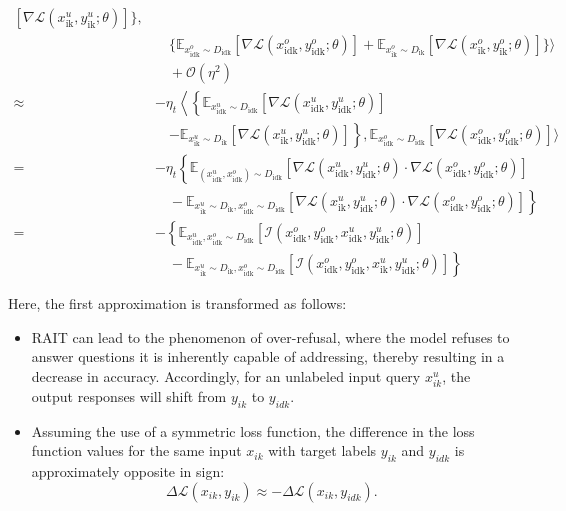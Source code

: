\begin{equation}
\begin{aligned}
\left[ \nabla \mathcal{L}(x^{u}_{\text{ik}}, y^{u}_{\text{ik}}; \theta) \right] 
\Bigg\}, \\ 
& \quad 
\Bigg\{ \mathbb{E}_{x^{o}_{\text{idk}} \sim D_{\text{idk}}} 
\left[ \nabla \mathcal{L}(x^{o}_{\text{idk}}, y^{o}_{\text{idk}}; \theta) \right] 
+ \mathbb{E}_{x^{o}_{\text{ik}} \sim D_{\text{ik}}} 
\left[ \nabla \mathcal{L}(x^{o}_{\text{ik}}, y^{o}_{\text{ik}}; \theta) \right] 
\Bigg\} 
\Bigg\rangle \\ 
& \quad + \mathcal{O}(\eta^2)
 \\
\approx & - \eta_t \left \langle  
\left \{
\mathbb{E}_{x^{u}_{\text{idk}} \sim D_{\text{idk}}} \left[ \nabla \mathcal{L}(x^{u}_{\text{idk}}, y^{u}_{\text{idk}}; \theta) \right] 
\right. \right. \\
& \quad \left. - \mathbb{E}_{x^{u}_{\text{ik}} \sim D_{\text{ik}}} \left[ \nabla \mathcal{L}(x^{u}_{\text{ik}}, y^{u}_{\text{idk}}; \theta) \right] \right \},  \mathbb{E}_{x^{o}_{\text{idk}} \sim D_{\text{idk}}} \left[ \nabla \mathcal{L}(x^{o}_{\text{idk}}, y^{o}_{\text{idk}}; \theta) \right] \Big \rangle \\
= & -\eta_t \left \{
\mathbb{E}_{(x^{u}_{\text{idk}}, x^o_{\text{idk}}) \sim D_{\text{idk}}} \left[ \nabla \mathcal{L}(x^{u}_{\text{idk}}, y^{u}_{\text{idk}}; \theta) \cdot \nabla \mathcal{L}(x^{o}_{\text{idk}}, y^{o}_{\text{idk}}; \theta) \right] \right. \\
&\quad - \left.
\mathbb{E}_{x^{u}_{\text{ik}} \sim D_{\text{ik}}, x^{o}_{\text{idk}} \sim D_{\text{idk}}} \left[ \nabla \mathcal{L}(x^{u}_{\text{ik}}, y^{u}_{\text{idk}}; \theta) \cdot \nabla \mathcal{L}(x^{o}_{\text{idk}}, y^{o}_{\text{idk}}; \theta) \right] \right \} \\
= & - \left \{ \mathbb{E} _{x^{u} _{\text{idk}}, x^o _{\text{idk}} \sim D _{\text{idk}}} \left[ \mathcal{I}(x^{o} _{\text{idk}}, y^{o} _{\text{idk}}, x^{u} _{\text{idk}}, y^{u} _{\text{idk}}; \theta) \right] \right. \\
& \quad - \left . \mathbb{E} _{x^{u} _{\text{ik}} \sim D _{\text{ik}}, x^{o} _{\text{idk}} \sim D _{\text{idk}}} \left[ \mathcal{I}(x^{o} _{\text{idk}}, y^{o} _{\text{idk}}, x^{u} _{\text{ik}}, y^{u} _{\text{idk}}; \theta) \right] \right \}
\end{aligned}
\end{equation}

Here, the first approximation is transformed as follows:
\begin{itemize}[leftmargin=*]
    \item RAIT can lead to the phenomenon of over-refusal, where the model refuses to answer questions it is inherently capable of addressing, thereby resulting in a decrease in accuracy. Accordingly, for an unlabeled input query $x_{ik}^u$, the output responses will shift from $y_{ik}$ to $y_{idk}$.
    \item Assuming the use of a symmetric loss function, the difference in the loss function values for the same input $x_{ik}$ with target labels $y_{ik}$ and $y_{idk}$ is approximately opposite in sign: 
    $$
    \Delta \mathcal{L}(x_{ik}, y_{ik}) \approx -\Delta \mathcal{L}(x_{ik}, y_{idk}).
    $$
\end{itemize}



